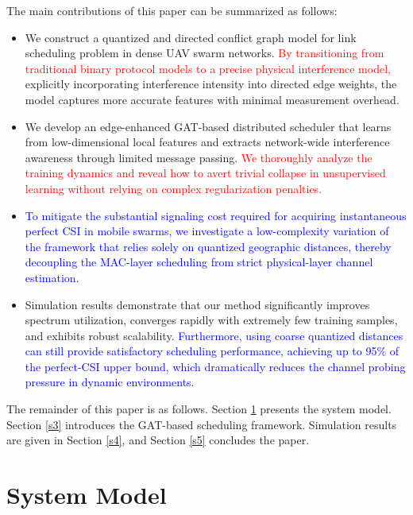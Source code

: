 \documentclass[journal]{IEEEtran}
\begin{document}
	The main contributions of this paper can be summarized as follows:
	\begin{itemize}
		\item[\textit{i)}] We construct a quantized and directed conflict graph model for link scheduling problem in dense UAV swarm networks. \textcolor{red}{By transitioning from traditional binary protocol models to a precise physical interference model,} explicitly incorporating interference intensity into directed edge weights, the model captures more accurate features with minimal measurement overhead.
		\item[\textit{ii)}] We develop an edge-enhanced GAT-based distributed scheduler that learns from low-dimensional local features and extracts network-wide interference awareness through limited message passing. \textcolor{red}{We thoroughly analyze the training dynamics and reveal how to avert trivial collapse in unsupervised learning without relying on complex regularization penalties.}
		\item[\textit{iii)}] \textcolor{blue}{To mitigate the substantial signaling cost required for acquiring instantaneous perfect CSI in mobile swarms, we investigate a low-complexity variation of the framework that relies solely on quantized geographic distances, thereby decoupling the MAC-layer scheduling from strict physical-layer channel estimation.}
		\item[\textit{iv)}] Simulation results demonstrate that our method significantly improves spectrum utilization, converges rapidly with extremely few training samples, and exhibits robust scalability. \textcolor{blue}{Furthermore, using coarse quantized distances can still provide satisfactory scheduling performance, achieving up to 95\% of the perfect-CSI upper bound, which dramatically reduces the channel probing pressure in dynamic environments.}
	\end{itemize}
	
	The remainder of this paper is as follows. Section \ref{s2} presents the system model. Section \ref{s3} introduces the GAT-based scheduling framework. Simulation results are given in Section \ref{s4}, and Section \ref{s5} concludes the paper.
	
	\section{System Model}\label{s2}
	
\end{document}
